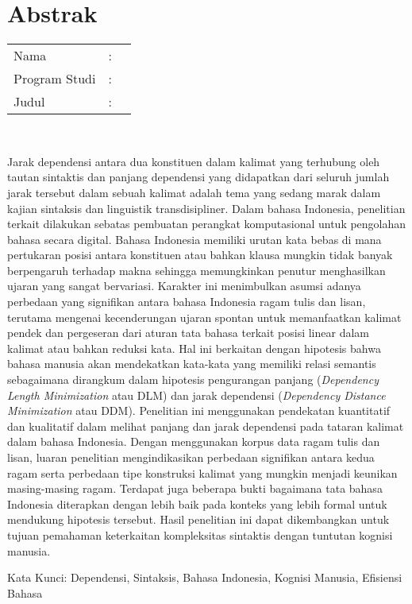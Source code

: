 %
%
%

\chapter*{Abstrak}

\vspace*{0.2cm}

\noindent \begin{tabular}{l l p{10cm}}
	Nama&: & \penulis \\
	Program Studi&: & \program \\
	Judul&: & \judul \\
\end{tabular} \\ 

\vspace*{1cm}

Jarak dependensi antara dua konstituen dalam kalimat yang terhubung oleh tautan sintaktis dan panjang dependensi yang didapatkan dari seluruh jumlah jarak tersebut dalam sebuah kalimat adalah tema yang sedang marak dalam kajian sintaksis dan linguistik transdisipliner. Dalam bahasa Indonesia, penelitian terkait dilakukan sebatas pembuatan perangkat komputasional untuk pengolahan bahasa secara digital. Bahasa Indonesia memiliki urutan kata bebas di mana pertukaran posisi antara konstituen atau bahkan klausa mungkin tidak banyak berpengaruh terhadap makna sehingga memungkinkan penutur menghasilkan ujaran yang sangat bervariasi. Karakter ini menimbulkan asumsi adanya perbedaan yang signifikan antara bahasa Indonesia ragam tulis dan lisan, terutama mengenai kecenderungan ujaran spontan untuk memanfaatkan kalimat pendek dan pergeseran dari aturan tata bahasa terkait posisi linear dalam kalimat atau bahkan reduksi kata. Hal ini berkaitan dengan hipotesis bahwa bahasa manusia akan mendekatkan kata-kata yang memiliki relasi semantis sebagaimana dirangkum dalam hipotesis pengurangan panjang (\textit{Dependency Length Minimization} atau DLM) dan jarak dependensi (\textit{Dependency Distance Minimization} atau DDM). Penelitian ini menggunakan pendekatan kuantitatif dan kualitatif dalam melihat panjang dan jarak dependensi pada tataran kalimat dalam bahasa Indonesia. Dengan menggunakan korpus data ragam tulis dan lisan, luaran penelitian mengindikasikan perbedaan signifikan antara kedua ragam serta perbedaan tipe konstruksi kalimat yang mungkin menjadi keunikan masing-masing ragam. Terdapat juga beberapa bukti bagaimana tata bahasa Indonesia diterapkan dengan lebih baik pada konteks yang lebih formal untuk mendukung hipotesis tersebut. Hasil penelitian ini dapat dikembangkan untuk tujuan pemahaman keterkaitan kompleksitas sintaktis dengan tuntutan kognisi manusia.

\vspace*{0.5cm}

\noindent Kata Kunci: 
\newline
\noindent Dependensi, Sintaksis, Bahasa Indonesia, Kognisi Manusia, Efisiensi Bahasa

\newpage